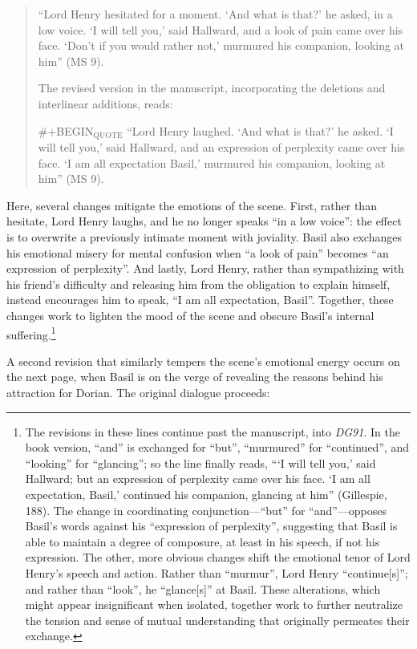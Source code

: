 \documentclass[11pt]{article}
\begin{document}
\begin{quote}
“Lord Henry hesitated for a moment. ‘And what is that?’ he asked, in a
low voice. ‘I will tell you,’ said Hallward, and a look of pain came
over his face. ‘Don’t if you would rather not,’ murmured his
companion, looking at him” (MS 9). 

The revised version in the manuscript, incorporating the deletions and
interlinear additions, reads: 

\#+BEGIN\(_{\text{QUOTE}}\) 
“Lord Henry laughed. ‘And what is that?’  he asked. ‘I will tell you,’
said Hallward, and an expression of perplexity came over his face. ‘I
am all expectation Basil,’ murmured his companion, looking at him” (MS
9).
\end{quote}

Here, several changes mitigate the emotions of the scene. First,
rather than hesitate, Lord Henry laughs, and he no longer speaks “in a
low voice”: the effect is to overwrite a previously intimate moment
with joviality. Basil also exchanges his emotional misery for mental
confusion when “a look of pain” becomes “an expression of
perplexity”. And lastly, Lord Henry, rather than sympathizing with his
friend’s difficulty and releasing him from the obligation to explain
himself, instead encourages him to speak, “I am all expectation,
Basil”. Together, these changes work to lighten the mood of the scene
and obscure Basil’s internal suffering.\footnote{The revisions in these lines continue past the manuscript, into
\emph{DG91}. In the book version, “and” is exchanged for “but”, “murmured”
for “continued”, and “looking” for “glancing”; so the line finally
reads, “‘I will tell you,’ said Hallward; but an expression of
perplexity came over his face. ‘I am all expectation, Basil,’
continued his companion, glancing at him” (Gillespie, 188). The change
in coordinating conjunction—“but” for “and”—opposes Basil’s words
against his “expression of perplexity”, suggesting that Basil is able
to maintain a degree of composure, at least in his speech, if not his
expression. The other, more obvious changes shift the emotional tenor
of Lord Henry’s speech and action. Rather than “murmur”, Lord Henry
“continue[s]”; and rather than “look”, he “glance[s]” at Basil. These
alterations, which might appear insignificant when isolated, together
work to further neutralize the tension and sense of mutual
understanding that originally permeates their exchange.}

A second revision that similarly tempers the scene’s emotional energy
occurs on the next page, when Basil is on the verge of revealing the
reasons behind his attraction for Dorian. The original dialogue
proceeds:
\end{document}
